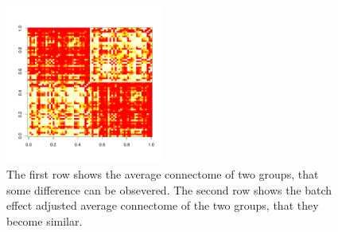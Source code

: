 \documentclass[simplex.tex]{subfiles}
\begin{document}
\begin{figure}[h!]
\begin{cframed}
\includegraphics[width=0.4635\textwidth, clip = true, trim = 0mm 15mm 0mm 10mm]{../../figs/avgA3adjusted}
\caption{The first row shows the average connectome of two groups, that some difference can be obsevered. The second row shows the batch effect adjusted average connectome of the two groups, that they become similar.}
\end{cframed}
\end{figure}
\end{document}

